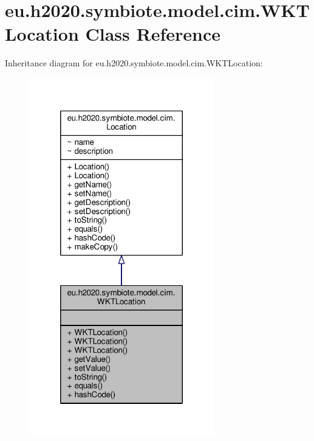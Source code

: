 \hypertarget{classeu_1_1h2020_1_1symbiote_1_1model_1_1cim_1_1WKTLocation}{}\section{eu.\+h2020.\+symbiote.\+model.\+cim.\+W\+K\+T\+Location Class Reference}
\label{classeu_1_1h2020_1_1symbiote_1_1model_1_1cim_1_1WKTLocation}


Inheritance diagram for eu.\+h2020.\+symbiote.\+model.\+cim.\+W\+K\+T\+Location\+:
\nopagebreak
\begin{figure}[H]
\begin{center}
\leavevmode
\includegraphics[width=228pt]{classeu_1_1h2020_1_1symbiote_1_1model_1_1cim_1_1WKTLocation__inherit__graph}
\end{center}
\end{figure}


